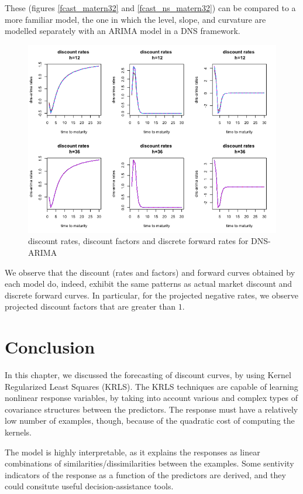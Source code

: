 \begin{table}[!htb]
These (figures \ref{fcast_matern32} and \ref{fcast_ns_matern32}) can be compared to a more familiar model, the one in which the level, slope, and curvature are modelled separately with an ARIMA model in a DNS framework. 

\begin{figure}[!htb]
\centering
\includegraphics[width=12.5cm]{gfx/chapter-krls-models/fcast_ns_arima}
\caption{discount rates, discount factors and discrete forward rates for DNS-ARIMA}
\label{fcast_ns_arima}
\end{figure}

We observe that the discount (rates and factors) and forward curves obtained by each model do, indeed, exhibit the same patterns as actual market discount and discrete forward curves. In particular, for the projected negative rates, we observe projected discount factors that are greater than $1$. 


\section{Conclusion}

In this chapter, we discussed the forecasting of discount curves, by using Kernel Regularized Least Squares (KRLS). The KRLS techniques are capable of learning nonlinear response variables, by taking into account various and complex types of covariance structures between the predictors. The response must have a relatively low number of examples, though, because of the quadratic cost of computing the kernels. 

The model is highly interpretable, as it explains the responses as linear combinations of similarities/dissimilarities between the examples. Some sentivity indicators of the response as a function of the predictors are derived, and they could consitute useful decision-assistance tools. 


\end{table}
